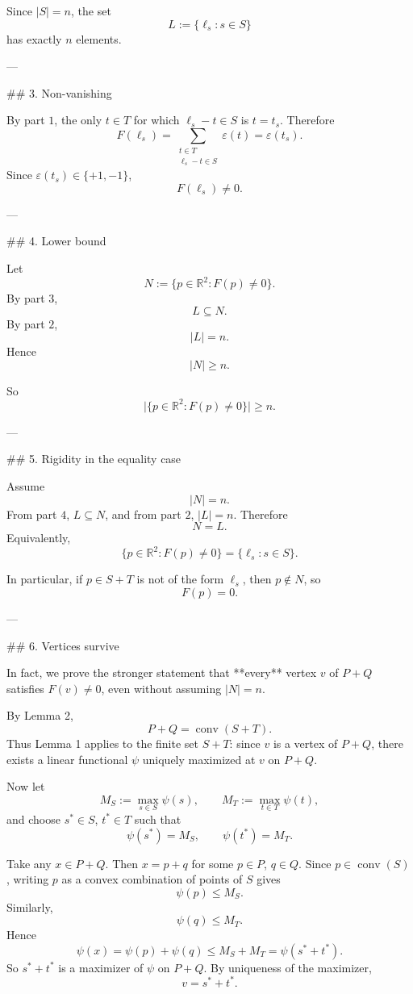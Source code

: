 Since \(|S|=n\), the set
\[
L:=\{\ell_s:s\in S\}
\]
has exactly \(n\) elements.

---

## 3. Non-vanishing

By part \(1\), the only \(t\in T\) for which \(\ell_s-t\in S\) is \(t=t_s\). Therefore
\[
F(\ell_s)
=
\sum_{\substack{t\in T\\ \ell_s-t\in S}}\varepsilon(t)
=
\varepsilon(t_s).
\]
Since \(\varepsilon(t_s)\in\{+1,-1\}\),
\[
F(\ell_s)\neq 0.
\]

---

## 4. Lower bound

Let
\[
N:=\{p\in\mathbb R^2:F(p)\neq 0\}.
\]
By part \(3\),
\[
L\subseteq N.
\]
By part \(2\),
\[
|L|=n.
\]
Hence
\[
|N|\ge n.
\]

So
\[
\bigl|\{p\in\mathbb R^2:F(p)\neq 0\}\bigr|\ge n.
\]

---

## 5. Rigidity in the equality case

Assume
\[
|N|=n.
\]
From part \(4\), \(L\subseteq N\), and from part \(2\), \(|L|=n\). Therefore
\[
N=L.
\]
Equivalently,
\[
\{p\in\mathbb R^2:F(p)\neq 0\}
=
\{\ell_s:s\in S\}.
\]

In particular, if \(p\in S+T\) is not of the form \(\ell_s\), then \(p\notin N\), so
\[
F(p)=0.
\]

---

## 6. Vertices survive

In fact, we prove the stronger statement that **every** vertex \(v\) of \(P+Q\) satisfies \(F(v)\neq 0\), even without assuming \(|N|=n\).

By Lemma 2,
\[
P+Q=\operatorname{conv}(S+T).
\]
Thus Lemma 1 applies to the finite set \(S+T\): since \(v\) is a vertex of \(P+Q\), there exists a linear functional \(\psi\) uniquely maximized at \(v\) on \(P+Q\).

Now let
\[
M_S:=\max_{s\in S}\psi(s),\qquad M_T:=\max_{t\in T}\psi(t),
\]
and choose \(s^\ast\in S\), \(t^\ast\in T\) such that
\[
\psi(s^\ast)=M_S,\qquad \psi(t^\ast)=M_T.
\]

Take any \(x\in P+Q\). Then \(x=p+q\) for some \(p\in P\), \(q\in Q\). Since \(p\in\operatorname{conv}(S)\), writing \(p\) as a convex combination of points of \(S\) gives
\[
\psi(p)\le M_S.
\]
Similarly,
\[
\psi(q)\le M_T.
\]
Hence
\[
\psi(x)=\psi(p)+\psi(q)\le M_S+M_T=\psi(s^\ast+t^\ast).
\]
So \(s^\ast+t^\ast\) is a maximizer of \(\psi\) on \(P+Q\). By uniqueness of the maximizer,
\[
v=s^\ast+t^\ast.
\]

